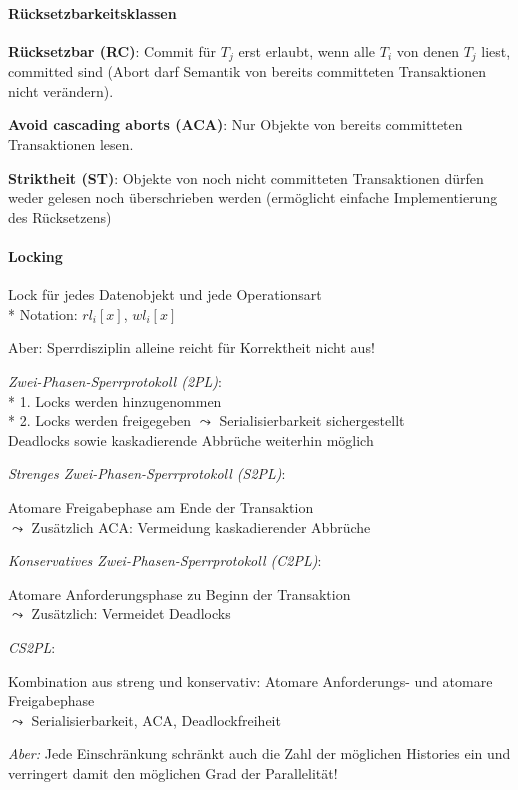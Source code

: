 \paragraph{Rücksetzbarkeitsklassen}
\begin{items}
	\item \textbf{Rücksetzbar (RC)}: Commit für $T_j$ erst erlaubt, wenn alle $T_i$ von denen $T_j$ liest, committed sind (Abort darf Semantik von bereits committeten Transaktionen nicht verändern).
	\item \textbf{Avoid cascading aborts (ACA)}: Nur Objekte von bereits committeten Transaktionen lesen.
	\item \textbf{Striktheit (ST)}: Objekte von noch nicht committeten Transaktionen dürfen weder gelesen noch überschrieben werden (ermöglicht einfache Implementierung des Rücksetzens)
\end{items}

\paragraph{Locking}
\begin{items}
	\item Lock für jedes Datenobjekt und jede Operationsart
		\\*
		Notation: \( rl_i[x] \), \( wl_i[x] \)
	\item Aber: Sperrdisziplin alleine reicht für Korrektheit nicht aus!
	
	\item \emph{Zwei-Phasen-Sperrprotokoll (2PL)}: \\*
		1. Locks werden hinzugenommen \\*
		2. Locks werden freigegeben
	\( \leadsto \) Serialisierbarkeit sichergestellt\\
						Deadlocks sowie kaskadierende Abbrüche weiterhin möglich
	
	\item \emph{Strenges Zwei-Phasen-Sperrprotokoll (S2PL)}: 
	
	Atomare Freigabephase am Ende der Transaktion\\
	\( \leadsto \) Zusätzlich ACA: Vermeidung kaskadierender Abbrüche
	
	\item \emph{Konservatives Zwei-Phasen-Sperrprotokoll (C2PL)}:
	
	Atomare Anforderungsphase zu Beginn der Transaktion\\
	\( \leadsto \) Zusätzlich: Vermeidet Deadlocks
	
	\item \emph{CS2PL}: 
	
	Kombination aus streng und konservativ: Atomare Anforderungs- und atomare Freigabephase \\
	\( \leadsto \) Serialisierbarkeit, ACA, Deadlockfreiheit
	
	\item \emph{Aber:} Jede Einschränkung schränkt auch die Zahl der möglichen Histories ein und verringert damit den möglichen Grad der Parallelität!
	
\end{items}

